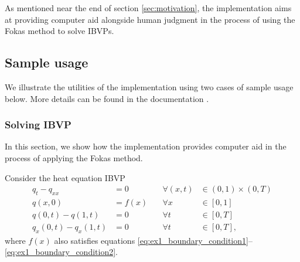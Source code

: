 \documentclass[12pt, oneside, a4paper]{article}
\begin{document}
As mentioned near the end of section \ref{sec:motivation}, the implementation aims at providing computer aid alongside human judgment in the process of using the Fokas method to solve IBVPs.

\subsection{Sample usage}
We illustrate the utilities of the implementation using two cases of sample usage below. More details can be found in the documentation \cite{Xiao}.

\subsubsection{Solving IBVP}\label{sec:ex1}
In this section, we show how the implementation provides computer aid in the process of applying the Fokas method.

Consider the heat equation IBVP
\begin{subequations}\label{eq:ex1}
    \begin{alignat}{3}
        q_t - q_{xx} &= 0\quad &\forall (x,t)&\in (0,1)\times (0,T) \label{eq:ex1_PDE}\\
        q(x,0) &= f(x) \quad &\forall x&\in [0,1]\label{eq:ex1_initial_condition}\\
        q(0,t) - q(1,t) &= 0 &\forall t&\in [0,T]\label{eq:ex1_boundary_condition1}\\
        q_x(0,t) - q_x(1,t) &= 0 &\forall t&\in [0,T]\label{eq:ex1_boundary_condition2},
    \end{alignat}
\end{subequations}
where $f(x)$ also satisfies equations \eqref{eq:ex1_boundary_condition1}--\eqref{eq:ex1_boundary_condition2}.
\end{document}
